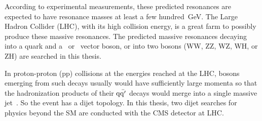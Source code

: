 According to experimental measurements, these predicted resonances are expected 
to have resonance masses at least a few hundred~GeV.  The Large Hadron Collider (LHC), 
with its high collision energy, is a great farm to possibly produce these massive resonances. 
The predicted massive resonances decaying into a quark and a \PW\ or \cPZ\ vector boson, or into two bosons (WW, ZZ, WZ, WH, or ZH) are searched in this thesis. 

In proton-proton (pp) collisions at the energies reached at the LHC, bosons emerging from such decays usually would have
sufficiently large momenta so that the hadronization products of their
${\rm q\bar{q'}}$ decays would merge into a single massive
jet~\cite{Gouzevitch:2013qca}. So the event has a 
dijet topology.  
In this thesis, two dijet searches for physics beyond the SM are 
conducted with the CMS detector at LHC. 





